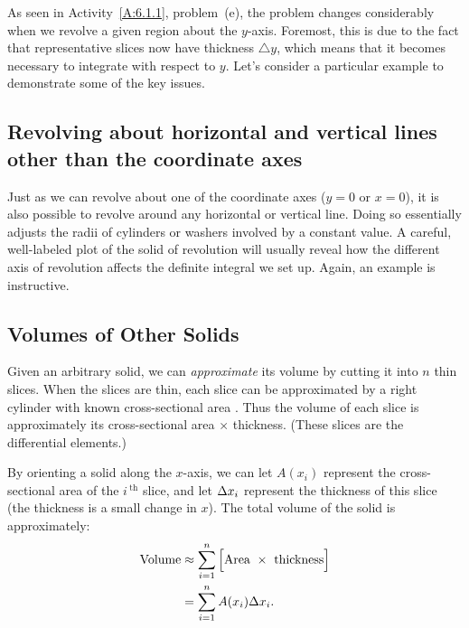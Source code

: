 As seen in Activity~\ref{A:6.1.1}, problem~(e), the problem changes considerably when we revolve a given region about the $y$-axis.  Foremost, this is due to the fact that representative slices now have thickness $\triangle y$, which means that it becomes necessary to integrate with respect to $y$.  Let's consider a particular example to demonstrate some of the key issues.



\subsection*{Revolving about horizontal and vertical lines other than the coordinate axes}

Just as we can revolve about one of the coordinate axes ($y = 0$ or $x = 0$), it is also possible to revolve around any horizontal or vertical line.  Doing so essentially adjusts the radii of cylinders or washers involved by a constant value.  A careful, well-labeled plot of the solid of revolution will usually reveal how the different axis of revolution affects the definite integral we set up.  Again, an example is instructive.



\subsection*{Volumes of Other Solids}

Given an arbitrary solid, we can \textit{approximate} its volume by cutting it into $n$  thin slices. When the slices are thin, each slice can be approximated by a right cylinder with known cross-sectional area . Thus the volume of each slice is approximately its cross-sectional area $\times$ thickness. (These slices are the differential elements.)

By orienting a solid along the $x$-axis, we can let $A(x_i)$ represent the cross-sectional area
of the $i\,^\text{th}$ slice, and let $\Delta x_i$ represent the thickness of this slice (the thickness is a small change in $x$). The total volume of the solid is approximately:
\begin{align*} \text{Volume} &\approx \sum_{i=1}^n \Big[\text{Area}\ \times\ \text{thickness}\Big] \\
&= \sum_{i=1}^n A(x_i)\dx_i.
\end{align*}
	
